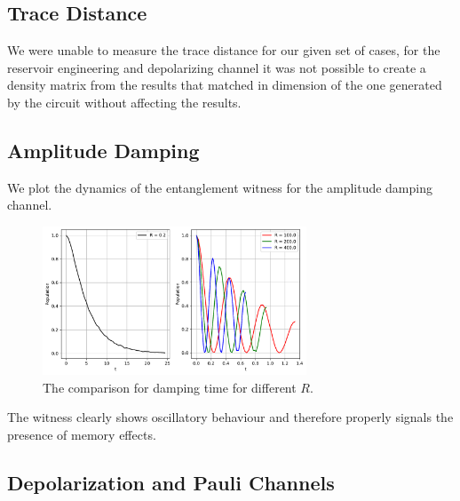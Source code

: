 \documentclass[12pt]{article}
\begin{document}
  \subsection{Trace Distance}

  We were unable to measure the trace distance for our given set of cases, for the reservoir engineering and depolarizing channel it was not possible to create a density matrix from the results that matched in dimension of the one generated by the circuit without affecting the results.


  \subsection{Amplitude Damping}
  We plot the dynamics of the entanglement witness for the amplitude damping channel.

  \begin{figure}
    \centering
    \includegraphics[width=0.7\textwidth]{images/amplitude_damping_population_non_markovianity.pdf}
    \caption{The comparison for damping time for different \( R \).%
      \label{fig:amplitude_damping_population}}
  \end{figure}

  The witness clearly shows oscillatory behaviour and therefore properly signals the presence of memory effects.


  \subsection{Depolarization and Pauli Channels}
\end{document}
